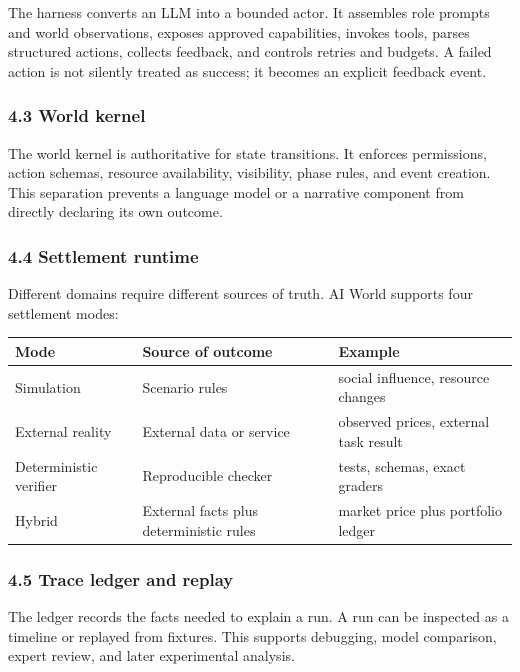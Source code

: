 \documentclass[
]{article}
\newcounter{none} %
\begin{document}
The harness converts an LLM into a bounded actor. It assembles role
prompts and world observations, exposes approved capabilities, invokes
tools, parses structured actions, collects feedback, and controls
retries and budgets. A failed action is not silently treated as success;
it becomes an explicit feedback event.

\subsubsection{4.3 World kernel}\label{43-world-kernel}

The world kernel is authoritative for state transitions. It enforces
permissions, action schemas, resource availability, visibility, phase
rules, and event creation. This separation prevents a language model or
a narrative component from directly declaring its own outcome.

\subsubsection{4.4 Settlement runtime}\label{44-settlement-runtime}

Different domains require different sources of truth. AI World supports
four settlement modes:

{\def\LTcaptype{none} %
\begin{longtable}[]{@{}lll@{}}
\toprule\noalign{}
Mode & Source of outcome & Example \\
\midrule\noalign{}
\endhead
\bottomrule\noalign{}
\endlastfoot
Simulation & Scenario rules & social influence, resource changes \\
External reality & External data or service & observed prices, external
task result \\
Deterministic verifier & Reproducible checker & tests, schemas, exact
graders \\
Hybrid & External facts plus deterministic rules & market price plus
portfolio ledger \\
\end{longtable}
}

\subsubsection{4.5 Trace ledger and
replay}\label{45-trace-ledger-and-replay}

The ledger records the facts needed to explain a run. A run can be
inspected as a timeline or replayed from fixtures. This supports
debugging, model comparison, expert review, and later experimental
analysis.
\end{document}
